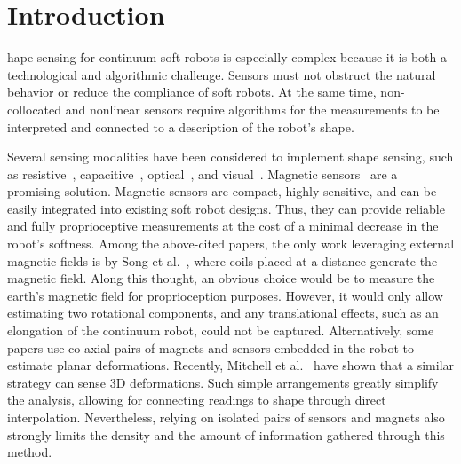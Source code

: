 \section{Introduction}\label{sec:promasens:introduction}
%
%
%
hape sensing for continuum soft robots is especially complex because it is both a technological and algorithmic challenge. Sensors must not obstruct the natural behavior or reduce the compliance of soft robots. At the same time, non-collocated and nonlinear sensors require algorithms for the measurements to be interpreted and connected to a description of the robot's shape.

Several sensing modalities have been considered to implement shape sensing, such as resistive~\citep{shih2019design, kramer2011soft}, capacitive~\citep{scimeca2019model, shintake2018ultrastretchable}, optical~\citep{li2021scaling}, and visual~\citep{rosi2022sensing}. Magnetic sensors~\citep{song2015electromagnetic, ozel2015precise, luo2017toward, guo2019continuum, mitchell2021fast} are a promising solution. Magnetic sensors are compact, highly sensitive, and can be easily integrated into existing soft robot designs. Thus, they can provide reliable and fully proprioceptive measurements at the cost of a minimal decrease in the robot's softness. Among the above-cited papers, the only work leveraging external magnetic fields is by Song et al.~\citep{song2015electromagnetic}, where coils placed at a distance generate the magnetic field.
Along this thought, an obvious choice would be to measure the earth's magnetic field for proprioception purposes. However, it would only allow estimating two rotational components, and any translational effects, such as an elongation of the continuum robot, could not be captured.
Alternatively, some papers \citep{ozel2015precise,luo2017toward,guo2019continuum} use co-axial pairs of magnets and sensors embedded in the robot to estimate planar deformations. Recently, Mitchell et al.~\citep{mitchell2021fast} have shown that a similar strategy can sense 3D deformations. Such simple arrangements greatly simplify the analysis, allowing for connecting readings to shape through direct interpolation. Nevertheless, relying on isolated pairs of sensors and magnets also strongly limits the density and the amount of information gathered through this method.

